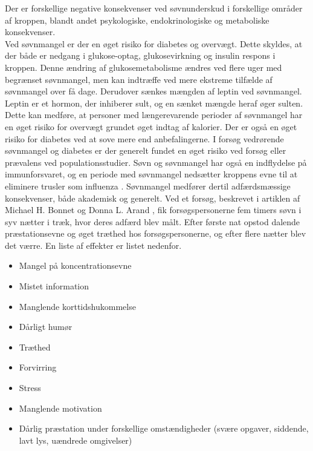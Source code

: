 Der er forskellige negative konsekvenser ved søvnunderskud i forskellige områder af kroppen, blandt andet psykologiske, endokrinologiske og metaboliske konsekvenser. 
\\
Ved søvnmangel er der en øget risiko for diabetes og overvægt. Dette skyldes, at der både er nedgang i glukose-optag, glukosevirkning og insulin respons i kroppen. Denne ændring af glukosemetabolisme ændres ved flere uger med begrænset søvnmangel, men kan indtræffe ved mere ekstreme tilfælde af søvnmangel over få dage. Derudover sænkes mængden af leptin ved søvnmangel. Leptin er et hormon, der inhiberer sult, og en sænket mængde heraf øger sulten. Dette kan medføre, at personer med længerevarende perioder af søvnmangel har en øget risiko for overvægt grundet øget indtag af kalorier. Der er også en øget risiko for diabetes ved at sove mere end anbefalingerne. \cite{Knutson2007}\cite{Chaput2007} I forsøg vedrørende søvnmangel og diabetes er der generelt fundet en øget risiko ved forsøg eller prævalens ved populationsstudier\cite{AlDabal2011}.
Søvn og søvnmangel har også en indflydelse på immunforsvaret, og en periode med søvnmangel nedsætter kroppens evne til at eliminere trusler som influenza \cite{Spiegel2002}\cite{Gryglewska2010}.
Søvnmangel medfører dertil adfærdsmæssige konsekvenser, både akademisk og generelt. Ved et forsøg, beskrevet i artiklen af Michael H. Bonnet og Donna L. Arand \cite{Bonnet2003}, fik forsøgspersonerne fem timers søvn i syv nætter i træk, hvor deres adfærd blev målt. Efter første nat opstod dalende præstationsevne og øget træthed hos forsøgspersonerne, og efter flere nætter blev det værre. En liste af effekter er listet nedenfor. 

\begin{itemize}
  \item Mangel på koncentrationsevne
  \item Mistet information
  \item Manglende korttidshukommelse
  \item Dårligt humør
  \item Træthed
  \item Forvirring
  \item Stress
  \item Manglende motivation
  \item Dårlig præstation under forskellige omstændigheder (svære opgaver, siddende, lavt lys, uændrede omgivelser) 
\end{itemize}




